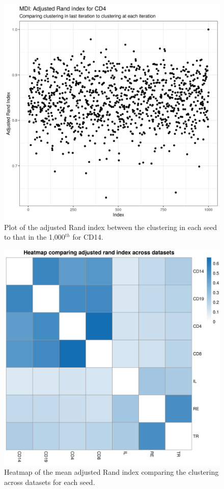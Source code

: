 \documentclass[12pt]{article} %
\begin{document}
	\begin{figure}[h]
		\centering
		\includegraphics[scale=0.75]{Images/Biology_data/Set_250/All_datasets/Adjusted_rand_index_plots/rand_index_plot_CD4.png}
		\caption{Plot of the adjusted Rand index between the clustering in each seed to that in the 1,000$^{th}$ for CD14.}
		\label{fig:results:cedar_1:mdi_cd4_adj_rand_ind_plot}
	\end{figure}
	
	\newpage
	
	\begin{figure}[h]
		\centering
		\includegraphics[scale=0.75]{Images/Biology_data/Set_250/All_datasets/Arandi_heatmap.png}
		\caption{Heatmap of the mean adjusted Rand index comparing the clustering across datasets for each seed.}
		\label{fig:results:cedar_1:mdi_adj_rand_ind_heatmap}
	\end{figure}
	
\end{document}
